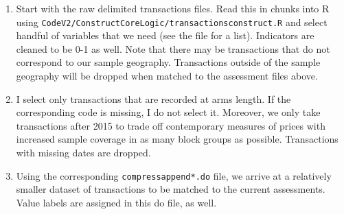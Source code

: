 \documentclass[]{article}
\begin{document}
\begin{enumerate}
	\item Start with the raw delimited transactions files. Read this in chunks into R using \texttt{CodeV2/Construct\textunderscore CoreLogic/transactions\textunderscore construct.R} and select handful of variables that we need (see the file for a list). Indicators are cleaned to be 0-1 as well. Note that there may be transactions that do not correspond to our sample geography. Transactions outside of the sample geography will be dropped when matched to the assessment files above. 
	
	\item I select only transactions that are recorded at arms length. If the corresponding code is missing, I do not select it.  Moreover, we only take transactions after 2015 to trade off contemporary measures of prices with increased sample coverage in as many block groups as possible. Transactions with missing dates are dropped. 
	
	\item Using the corresponding \texttt{compress\textunderscore append*.do} file, we arrive at a relatively smaller dataset of transactions to be matched to the current assessments. Value labels are assigned in this do file, as well. 
\end{enumerate}
\end{document}
